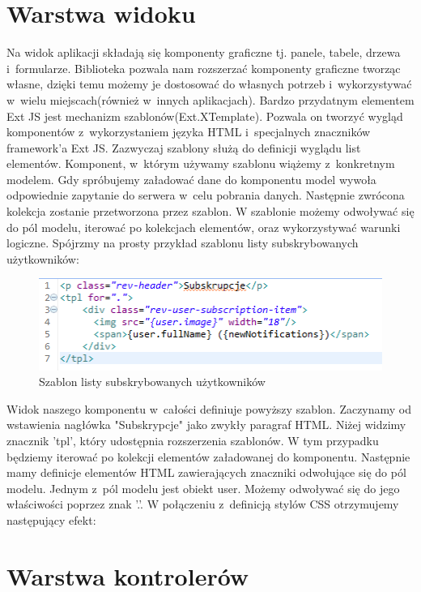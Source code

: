 \section{Warstwa widoku}

Na widok aplikacji składają się komponenty graficzne tj. panele, tabele, drzewa i~formularze. Biblioteka pozwala nam rozszerzać komponenty graficzne tworząc własne, dzięki temu możemy je dostosować do własnych potrzeb i~wykorzystywać w~wielu miejscach(również w~innych aplikacjach). Bardzo przydatnym elementem Ext JS jest mechanizm szablonów(Ext.XTemplate). Pozwala on tworzyć wygląd komponentów z~wykorzystaniem języka HTML i~specjalnych znaczników framework'a Ext JS. Zazwyczaj szablony służą do definicji wyglądu list elementów. Komponent, w~którym używamy szablonu wiążemy z~konkretnym modelem. Gdy spróbujemy załadować dane do komponentu model wywoła odpowiednie zapytanie do serwera w~celu pobrania danych. Następnie zwrócona kolekcja zostanie przetworzona przez szablon. W szablonie możemy odwoływać się do pól modelu, iterować po kolekcjach elementów, oraz wykorzystywać warunki logiczne. Spójrzmy na prosty przykład szablonu listy subskrybowanych użytkowników:
 
\begin{figure}[H]
	\centering
	\includegraphics[width=\textwidth]{images/tpl.png}
	\caption{Szablon listy subskrybowanych użytkowników}
\end{figure}

Widok naszego komponentu w~całości definiuje powyższy szablon. Zaczynamy od wstawienia nagłówka "Subskrypcje" jako zwykły paragraf HTML. Niżej widzimy znacznik 'tpl', który udostępnia rozszerzenia szablonów. W tym przypadku będziemy iterować po kolekcji elementów załadowanej do komponentu. Następnie mamy definicje elementów HTML zawierających znaczniki odwołujące się do pól modelu. Jednym z~pól modelu jest obiekt user. Możemy odwoływać się do jego właściwości poprzez znak '.'. W połączeniu z~definicją stylów CSS otrzymujemy następujący efekt:

 


\section{Warstwa kontrolerów}

